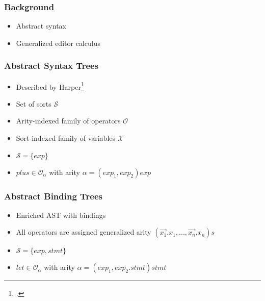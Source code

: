 \documentclass[t,24pt,aspectratio=169]{beamer}
\begin{document}
\begin{frame}
    \frametitle{Background}
    \begin{itemize}
        \item Abstract syntax
        \item Generalized editor calculus
    \end{itemize}
\end{frame}

\begin{frame}
    \frametitle{Abstract Syntax Trees}
    \begin{multicols}{2}
        \begin{itemize}
            \item Described by Harper\footcite{harper}
            \item Set of sorts $\mathcal{S}$
            \item Arity-indexed family of operators $\mathcal{O}$
            \item Sort-indexed family of variables $\mathcal{X}$
        \end{itemize}

        \columnbreak
        \pause
        \begin{itemize}
            \item $\mathcal{S} = \{ exp \}$
            \item $plus \in \mathcal{O}_\alpha$ with arity $\alpha = (exp_1,exp_2)exp$
        \end{itemize}

    \end{multicols}

\end{frame}

\begin{frame}
    \frametitle{Abstract Binding Trees}
    \begin{multicols}{2}
        \begin{itemize}
            \item Enriched AST with bindings
            \item All operators are assigned generalized arity $(\vec{x_1}.x_1,...,\vec{x_n}.x_n)s$
        \end{itemize}
        \columnbreak
        \pause
        \begin{itemize}
            \item $\mathcal{S} = \{ exp, stmt \}$
            \item $let \in \mathcal{O}_\alpha$ with arity $\alpha = (exp_1,exp_2.stmt)stmt$
        \end{itemize}
    \end{multicols}

\end{frame}
\end{document}
